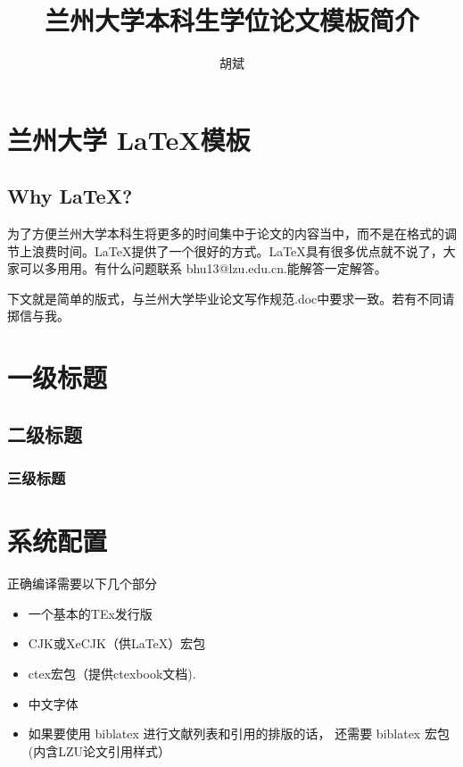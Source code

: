 \documentclass{LZUthesis}
\begin{document}
%
%

\title{兰州大学本科生学位论文模板简介}
\author{胡斌}



\maketitle

\makestatement



\frontmatter
\tableofcontents
\mainmatter
\chapter{兰州大学 \LaTeX 模板}

\section{Why \LaTeX ? }
为了方便兰州大学本科生将更多的时间集中于论文的内容当中，而不是在格式的调节上浪费时间。\LaTeX{}提供了一个很好的方式。\LaTeX{}具有很多优点就不说了，大家可以多用用。有什么问题联系 bhu13@lzu.edu.cn.能解答一定解答。
\par 下文就是简单的版式，与兰州大学毕业论文写作规范.doc中要求一致。若有不同请掷信与我。
\chapter{一级标题}
\section{二级标题}
\subsection{三级标题}
\chapter{系统配置}
正确编译需要以下几个部分
\begin{itemize}

\item 一个基本的TEx发行版
\item CJK或XeCJK（供\LaTeX ）宏包
\item ctex宏包（提供ctexbook文档).
\item 中文字体
\item 如果要使用 biblatex 进行文献列表和引用的排版的话， 还需要 biblatex 宏包(内含LZU论文引用样式）
\end{itemize}
\end{document}
